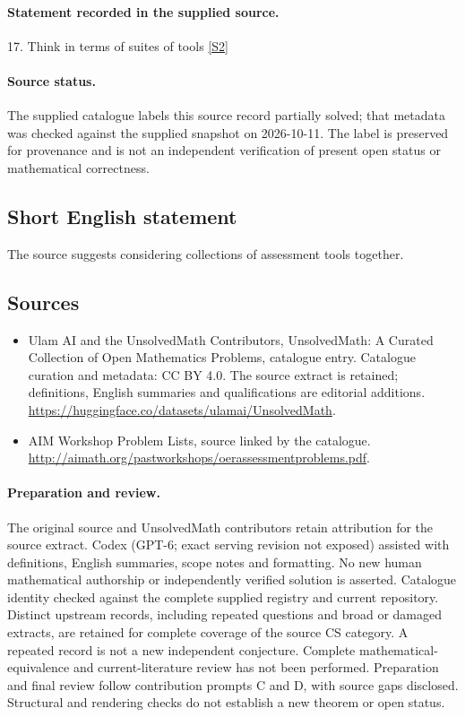 \documentclass[11pt]{article}
\begin{document}
\paragraph{Statement recorded in the supplied source.}
17. Think in terms of suites of tools \href{http://aimath.org/pastworkshops/oerassessmentproblems.pdf}{[S2]}
\paragraph{Source status.}
The supplied catalogue labels this source record partially solved; that metadata was checked against the supplied snapshot on 2026-10-11. The label is preserved for provenance and is not an independent verification of present open status or mathematical correctness.
\subsection{Short English statement}
The source suggests considering collections of assessment tools together.
\subsection{Sources}
\begin{itemize}
\item[S1] Ulam AI and the UnsolvedMath Contributors, UnsolvedMath: A Curated Collection of Open Mathematics Problems, catalogue entry. Catalogue curation and metadata: CC BY 4.0. The source extract is retained; definitions, English summaries and qualifications are editorial additions.
\url{https://huggingface.co/datasets/ulamai/UnsolvedMath}.
\item[S2] AIM Workshop Problem Lists, source linked by the catalogue.
\url{http://aimath.org/pastworkshops/oerassessmentproblems.pdf}.
\end{itemize}
\paragraph{Preparation and review.}
The original source and UnsolvedMath contributors retain attribution for the source extract. Codex (GPT-6; exact serving revision not exposed) assisted with definitions, English summaries, scope notes and formatting. No new human mathematical authorship or independently verified solution is asserted. Catalogue identity checked against the complete supplied registry and current repository. Distinct upstream records, including repeated questions and broad or damaged extracts, are retained for complete coverage of the source CS category. A repeated record is not a new independent conjecture. Complete mathematical-equivalence and current-literature review has not been performed. Preparation and final review follow contribution prompts C and D, with source gaps disclosed. Structural and rendering checks do not establish a new theorem or open status.
\label{end:statement}
\end{document}
